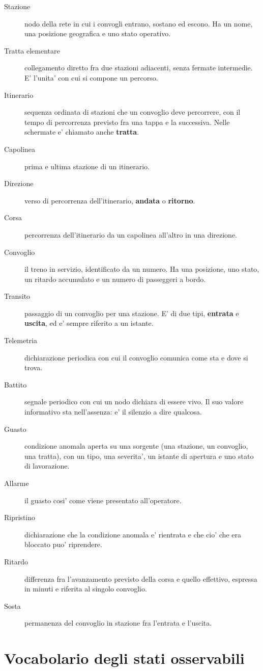 \documentclass[11pt]{article}
\begin{document}
\begin{description}
\item[{Stazione}] nodo della rete in cui i convogli entrano, sostano ed escono. Ha un nome, una
posizione geografica e uno stato operativo.
\item[{Tratta elementare}] collegamento diretto fra due stazioni adiacenti, senza fermate intermedie.
E' l'unita' con cui si compone un percorso.
\item[{Itinerario}] sequenza ordinata di stazioni che un convoglio deve percorrere, con il tempo di
percorrenza previsto fra una tappa e la successiva. Nelle schermate e' chiamato anche \textbf{tratta}.
\item[{Capolinea}] prima e ultima stazione di un itinerario.
\item[{Direzione}] verso di percorrenza dell'itinerario, \textbf{andata} o \textbf{ritorno}.
\item[{Corsa}] percorrenza dell'itinerario da un capolinea all'altro in una direzione.
\item[{Convoglio}] il treno in servizio, identificato da un numero. Ha una posizione, uno stato, un
ritardo accumulato e un numero di passeggeri a bordo.
\item[{Transito}] passaggio di un convoglio per una stazione. E' di due tipi, \textbf{entrata} e \textbf{uscita}, ed e'
sempre riferito a un istante.
\item[{Telemetria}] dichiarazione periodica con cui il convoglio comunica come sta e dove si trova.
\item[{Battito}] segnale periodico con cui un nodo dichiara di essere vivo. Il suo valore informativo sta
nell'assenza: e' il silenzio a dire qualcosa.
\item[{Guasto}] condizione anomala aperta su una sorgente (una stazione, un convoglio, una tratta), con
un tipo, una severita', un istante di apertura e uno stato di lavorazione.
\item[{Allarme}] il guasto cosi' come viene presentato all'operatore.
\item[{Ripristino}] dichiarazione che la condizione anomala e' rientrata e che cio' che era bloccato puo'
riprendere.
\item[{Ritardo}] differenza fra l'avanzamento previsto della corsa e quello effettivo, espressa in
minuti e riferita al singolo convoglio.
\item[{Sosta}] permanenza del convoglio in stazione fra l'entrata e l'uscita.
\end{description}
\section{Vocabolario degli stati osservabili}
\label{sec:org518cfab}
\end{document}
